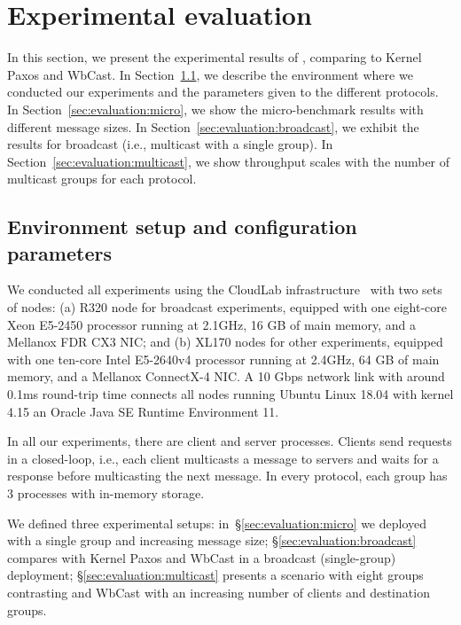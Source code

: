 \section{Experimental evaluation}
\label{sec:experimental-evaluation}

In this section, we present the experimental results of \libname, comparing to Kernel Paxos 
and WbCast. %
In Section~\ref{sec:evaluation:setup}, we describe the environment where we conducted our experiments and the parameters given to the different protocols.
In Section~\ref{sec:evaluation:micro}, we show the micro-benchmark results with different message sizes.
In Section~\ref{sec:evaluation:broadcast}, we exhibit the results for broadcast (i.e., multicast with a single group).
In Section~\ref{sec:evaluation:multicast}, we show throughput scales with the number of multicast groups for each protocol.


\subsection{Environment setup and configuration parameters}
\label{sec:evaluation:setup}

We conducted all experiments using the CloudLab infrastructure~\cite{DuplyakinATC19cloudlab} with two sets of nodes: 
(a) R320 node for broadcast experiments, equipped with one eight-core Xeon E5-2450 processor running at 2.1GHz, 16 GB of main memory, and a Mellanox FDR CX3 NIC; and (b) XL170 nodes for other experiments, equipped with one ten-core Intel E5-2640v4 processor running at 2.4GHz, 64 GB of main memory, and a Mellanox ConnectX-4 NIC. 
A 10 Gbps network link with around 0.1ms round-trip time connects all nodes running Ubuntu Linux 18.04 with kernel 4.15 an Oracle Java SE Runtime Environment 11. 

In all our experiments, there are client and server processes. 
Clients send requests in a closed-loop, i.e., each client multicasts a message to servers and waits for a response before multicasting the next message. 
In every protocol, each group has 3 processes with in-memory storage.

We defined three experimental setups:
in~\S\ref{sec:evaluation:micro} we deployed \libname with a single group and increasing message size;
\S\ref{sec:evaluation:broadcast} compares \libname with Kernel Paxos and WbCast in a broadcast (single-group) deployment;
\S\ref{sec:evaluation:multicast} presents a scenario with eight groups contrasting \libname and WbCast with an increasing number of clients and destination groups.

